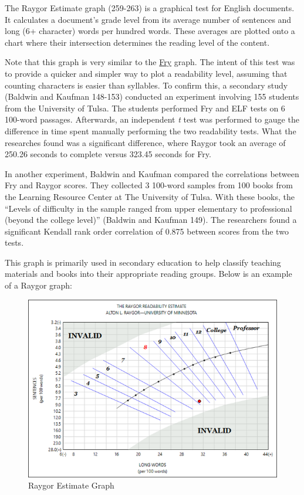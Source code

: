 \documentclass[
]{book}
\theoremstyle{definition}
\theoremstyle{definition}
\theoremstyle{definition}
\theoremstyle{definition}
\theoremstyle{remark}
\begin{document}
The Raygor Estimate graph (259-263) is a graphical test for English documents. It calculates a document's grade level from its average number of sentences and long (6+ character) words per hundred words. These averages are plotted onto a chart where their intersection determines the reading level of the content.

Note that this graph is very similar to the \protect\hyperlink{fry-test}{Fry} graph. The intent of this test was to provide a quicker and simpler way to plot a readability level, assuming that counting characters is easier than syllables. To confirm this, a secondary study (Baldwin and Kaufman 148-153) conducted an experiment involving 155 students from the University of Tulsa. The students performed Fry and ELF tests on 6 100-word passages. Afterwards, an independent \emph{t} test was performed to gauge the difference in time spent manually performing the two readability tests. What the researches found was a significant difference, where Raygor took an average of 250.26 seconds to complete versus 323.45 seconds for Fry.

In another experiment, Baldwin and Kaufman compared the correlations between Fry and Raygor scores. They collected 3 100-word samples from 100 books from the Learning Resource Center at The University of Tulsa. With these books, the ``Levels of difficulty in the sample ranged from upper elementary to professional (beyond the college level)'' (Baldwin and Kaufman 149). The researchers found a significant Kendall rank order correlation of 0.875 between scores from the two tests.

This graph is primarily used in secondary education to help classify teaching materials and books into their appropriate reading groups. Below is an example of a Raygor graph:

\begin{figure}[H]

{\centering \includegraphics[width=0.75\linewidth,]{Images/raygorgraph} 

}

\caption{Raygor Estimate Graph}\label{fig:raygor}
\end{figure}
\end{document}

